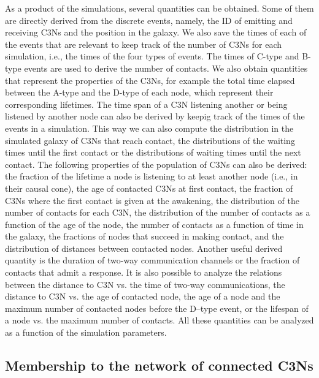 \documentclass[crop]{CSLB}
\newcommand{\ceti}{C3N}
\newcommand{\cetis}{C3Ns}
\begin{document}
As a product of the simulations, several quantities can be obtained.
%
Some of them are directly derived from the discrete events, namely, the ID of
emitting and receiving \cetis{} and the position in the galaxy.
%
We also save the times of each of the events that are relevant to keep track of
the number of \cetis{} for each simulation, i.e., the times of the four types
of events.
%
The times of C-type and B-type events are used to derive the number of
contacts.
%
We also obtain quantities that represent the properties of the \cetis{}, for
example the total time elapsed between the A-type and the D-type of each node,
which represent their corresponding lifetimes.
%
The time span of a \ceti{} listening another or being listened by another node
can also be derived by keepig track of the times of the events in a simulation.
%
This way we can also compute the distribution in the simulated galaxy of
\cetis{} that reach contact, the distributions of the waiting times until the
first contact or the distributions of waiting times until the next contact.
%
The following properties of the population of \cetis{} can also be derived:
%
the fraction of the lifetime a node is listening to at least another node
(i.e., in their causal cone),
%
the age of contacted \cetis{} at first contact,
%
the fraction of \cetis{} where the first contact is given at the awakening,
%
the distribution of the number of contacts for each \ceti{},
%
the distribution of the number of contacts as a function of the age of the
node,
%
the number of contacts as a function of time in the galaxy,
%
the fractions of nodes that succeed in making contact,
%
and the distribution of distances between contacted nodes.
%
Another useful derived quantity is the duration of two-way communication
channels or the fraction of contacts that admit a response.
% 
It is also possible to analyze the relations between the distance to \ceti{}
vs. the time of two-way communications, the distance to \ceti{} vs. the age of
contacted node, the age of a node and the maximum number of contacted nodes
before the D--type event, or the lifespan of a node vs. the maximum number of
contacts.
%
All these quantities can be analyzed as a function of the simulation
parameters.
%






\subsection{Membership to the network of connected \cetis{}}\label{SS_members}
\end{document}

